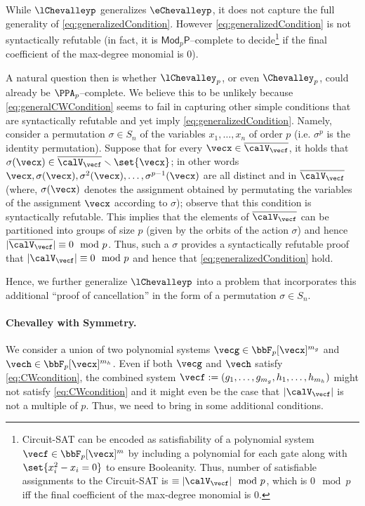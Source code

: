 \noindent While $\lChevalleyp$ generalizes $\eChevalleyp$, it does not
capture the full generality of \eqref{eq:generalizedCondition}. However \eqref{eq:generalizedCondition} is not syntactically refutable (in fact, it is $\mathsf{Mod}_p\mathsf{P}$--complete to decide\footnote{Circuit-SAT can be encoded as satisfiability of a polynomial system $\vecf \in \bbF_p[\vecx]^m$ by including a polynomial for each gate along with $\set{x_i^2 - x_i = 0}$ to ensure Booleanity. Thus, number of satisfiable assignments to the Circuit-SAT is $\equiv |\calV_{\vecf}| \mod{p}$, which is $0 \mod{p}$ iff the final coefficient of the max-degree monomial is $0$.} if the final coefficient of the max-degree monomial is $0$).

A natural question then is whether $\lChevalley_p$, or even $\Chevalley_p$, could already be $\PPA_p$--complete. We believe this to be unlikely because \eqref{eq:generalCWCondition} seems to fail in capturing other simple conditions that are syntactically refutable and yet imply \eqref{eq:generalizedCondition}. Namely, consider a permutation $\sigma \in S_n$ of the variables $x_1, \ldots, x_n$ of order $p$ (i.e. $\sigma^p$ is the identity permutation). Suppose that for every $\vecx \in \overline{\calV_{\vecf}}$, it holds that $\sigma(\vecx) \in \overline{\calV_{\vecf}} \smallsetminus \set{\vecx}$; in other words $\vecx, \sigma(\vecx), \sigma^2(\vecx), \ldots, \sigma^{p-1}(\vecx)$ are all distinct and in $\overline{\calV_{\vecf}}$ (where, $\sigma(\vecx)$ denotes the assignment obtained by permutating the variables of the assignment $\vecx$ according to $\sigma$); observe that this condition is syntactically refutable. This implies that the elements of $\overline{\calV_{\vecf}}$ can be partitioned into groups of size $p$ (given by the orbits of the action $\sigma$) and hence $|\overline{\calV_{\vecf}}| \equiv 0 \mod{p}$. Thus, such a $\sigma$ provides a syntactically refutable proof that $|\calV_{\vecf}| \equiv 0 \mod{p}$ and hence that \eqref{eq:generalizedCondition} hold.

Hence, we further generalize 
$\lChevalleyp$ into a problem that incorporates this additional ``proof of cancellation'' in the form of a permutation $\sigma \in S_n$.

\paragraph{Chevalley with Symmetry.}
We consider a union of two polynomial systems $\vecg  \in \bbF_p[\vecx]^{m_g}$ and $\vech \in \bbF_p[\vecx]^{m_h}$. Even if both $\vecg$ and
$\vech$ satisfy \eqref{eq:CWcondition}, the combined system $\vecf :=
(g_1, \ldots, g_{m_g}, h_1, \ldots, h_{m_h})$ might not satisfy \eqref{eq:CWcondition}
and it might even be the case that $|\calV_{\vecf}|$ is not a multiple of $p$. Thus, we need to bring in some additional conditions.

